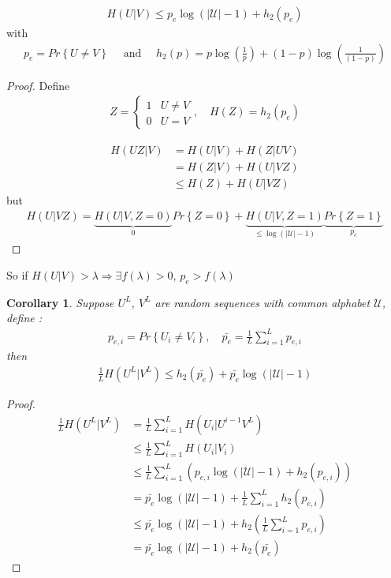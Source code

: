 \documentclass[twoside]{article}
\newtheorem{corollary}{Corollary}[theorem]
\theoremstyle{definition} %
\renewcommand{\Pr}[1]{Pr\left\{#1\right\}}
\def\U{\mathcal{U}}
\begin{document}
\begin{align*}
  H(U | V) \leq p_e \log(|\U| - 1) + h_2(p_e)
\end{align*}
with
\begin{align*}
  p_e = \Pr{U \neq V}
  \quad \text{ and } \quad
  h_2(p) = p \log(\frac{1}{p}) + (1 - p) \log(\frac{1}{(1-p)})
\end{align*}

\begin{proof}
  Define
  \begin{align*}
    Z =
    \left\{
    \begin{array}{ll}
      1 & U \neq V \\
      0 & U = V
    \end{array}
    \right. , \quad
    H(Z) = h_2(p_e)
  \end{align*}

  \begin{align*}
    H(UZ | V) &= H(U|V) + H(Z | UV) \\
    &= H(Z | V) + H(U | VZ) \\
    &\leq H(Z) + H(U | VZ)
  \end{align*}
  but
  \begin{align*}
    H(U | VZ) = \underbrace{H(U | V, Z = 0)}_{0}\Pr{Z = 0} + \underbrace{H(U | V, Z = 1)}_{\leq \log(|\U| - 1)}\underbrace{\Pr{Z = 1}}_{p_e}
  \end{align*}
\end{proof}

So if $H(U|V) > \lambda \Rightarrow \exists f(\lambda) > 0$, $p_e > f(\lambda)$

\begin{corollary}
  Suppose $U^L$, $V^L$ are random sequences with common alphabet $\U$, define :
  \begin{align*}
    p_{e,i} = \Pr{U_i \neq V_i} , \quad
    \bar{p_e} = \frac{1}{L} \sum_{i = 1}^{L} p_{e,i}
  \end{align*}
  then
  \begin{align*}
    \frac{1}{L} H(U^L | V^L) \leq h_2(\bar{p_e}) + \bar{p_e} \log(|\U| - 1)
  \end{align*}
\end{corollary}

\begin{proof}
  \begin{align*}
    \frac{1}{L} H(U^L | V^L) &= \frac{1}{L} \sum_{i = 1}^{L} H(U_i | U^{i-1} V^L) \\
    &\leq \frac{1}{L} \sum_{i = 1}^{L} H(U_i | V_i) \\
    &\leq \frac{1}{L} \sum_{i = 1}^{L}(p_{e,i} \log(|\U| - 1) + h_2(p_{e, i})) \\
    &= \bar{p_e} \log(|\U| - 1) + \frac{1}{L} \sum_{i = 1}^L h_2(p_{e,i}) \\
    &\leq \bar{p_e} \log(|\U| - 1) + h_2(\frac{1}{L} \sum_{i = 1}^L p_{e,i}) \\
    &= \bar{p_e} \log(|\U| - 1) + h_2(\bar{p_e})
  \end{align*}
\end{proof}
\end{document}
